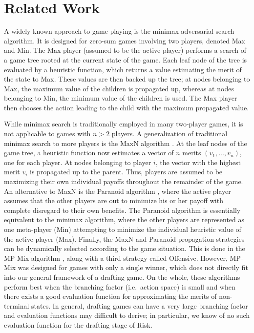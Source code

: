 \documentclass[letterpaper]{article}
\numberwithin{equation}{section}
\numberwithin{theorem}{section}
\numberwithin{lemma}{section}
\numberwithin{df}{section}
\begin{document}
\section{Related Work}

A widely known approach to game playing is the minimax adversarial search algorithm.  It is designed for zero-sum games involving two players, denoted Max and Min.  The Max player (assumed to be the active player) performs a search of a game tree rooted at the current state of the game.  Each leaf node of the tree is evaluated by a heuristic function, which returns a value estimating the merit of the state to Max.  These values are then backed up the tree; at nodes belonging to Max, the maximum value of the children is propagated up, whereas at nodes belonging to Min, the minimum value of the children is used.  The Max player then chooses the action leading to the child with the maximum propagated value.


While minimax search is traditionally employed in many two-player games, it is not applicable to games with $n > 2$ players.  A generalization of traditional minimax search to more players is the MaxN algorithm \cite{MaxN}.  At the leaf nodes of the game tree, a heuristic function now estimates a vector of $n$ merits $(v_1, ..., v_n)$, one for each player.  At nodes belonging to player $i$, the vector with the highest merit $v_i$ is propagated up to the parent.  Thus, players are assumed to be maximizing their own individual payoffs throughout the remainder of the game.  An alternative to MaxN is the Paranoid algorithm \cite{Paranoid}, where the active player assumes that the other players are out to minimize his or her payoff with complete disregard to their own benefits.  The Paranoid algorithm is essentially equivalent to the minimax algorithm, where the other players are represented as one meta-player (Min) attempting to minimize the individual heuristic value of the active player (Max).  Finally, the MaxN and Paranoid propagation strategies can be dynamically selected according to the game situation.  This is done in the MP-Mix algorithm \cite{ZuckFelnerKraus2009}, along with a third strategy called Offensive.  However, MP-Mix was designed for games with only a single winner, which does not directly fit into our general framework of a drafting game.  On the whole, these algorithms perform best when the branching factor (i.e.~action space) is small and when there exists a good evaluation function for approximating the merits of non-terminal states.  In general, drafting games can have a very large branching factor and evaluation functions may difficult to derive; in particular, we know of no such evaluation function for the drafting stage of Risk.
\end{document}
